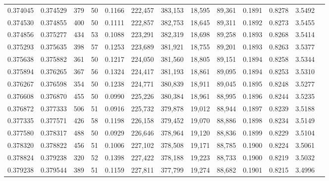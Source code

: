 \begin{tabular}{rrrrrrrrrrrrr}
0.374045 & 0.374529 &   379 &  50 &                                     0.1166 & 222,457 & 383,153 &  18,595 &  89,361 & 0.1891 & 0.8278 & 3.5492 \\
0.374530 & 0.374855 &   400 &  50 &                                     0.1111 & 222,857 & 382,753 &  18,645 &  89,311 & 0.1892 & 0.8273 & 3.5455 \\
0.374856 & 0.375277 &   434 &  53 &                                     0.1088 & 223,291 & 382,319 &  18,698 &  89,258 & 0.1893 & 0.8268 & 3.5414 \\
0.375293 & 0.375635 &   398 &  57 &                                     0.1253 & 223,689 & 381,921 &  18,755 &  89,201 & 0.1893 & 0.8263 & 3.5377 \\
0.375638 & 0.375882 &   361 &  50 &                                     0.1217 & 224,050 & 381,560 &  18,805 &  89,151 & 0.1894 & 0.8258 & 3.5344 \\
0.375894 & 0.376265 &   367 &  56 &                                     0.1324 & 224,417 & 381,193 &  18,861 &  89,095 & 0.1894 & 0.8253 & 3.5310 \\
0.376267 & 0.376598 &   354 &  50 &                                     0.1238 & 224,771 & 380,839 &  18,911 &  89,045 & 0.1895 & 0.8248 & 3.5277 \\
0.376608 & 0.376870 &   455 &  50 &                                     0.0990 & 225,226 & 380,384 &  18,961 &  88,995 & 0.1896 & 0.8244 & 3.5235 \\
0.376872 & 0.377333 &   506 &  51 &                                     0.0916 & 225,732 & 379,878 &  19,012 &  88,944 & 0.1897 & 0.8239 & 3.5188 \\
0.377335 & 0.377571 &   426 &  58 &                                     0.1198 & 226,158 & 379,452 &  19,070 &  88,886 & 0.1898 & 0.8234 & 3.5149 \\
0.377580 & 0.378317 &   488 &  50 &                                     0.0929 & 226,646 & 378,964 &  19,120 &  88,836 & 0.1899 & 0.8229 & 3.5104 \\
0.378320 & 0.378822 &   456 &  51 &                                     0.1006 & 227,102 & 378,508 &  19,171 &  88,785 & 0.1900 & 0.8224 & 3.5061 \\
0.378824 & 0.379238 &   320 &  52 &                                     0.1398 & 227,422 & 378,188 &  19,223 &  88,733 & 0.1900 & 0.8219 & 3.5032 \\
0.379238 & 0.379544 &   389 &  51 &                                     0.1159 & 227,811 & 377,799 &  19,274 &  88,682 & 0.1901 & 0.8215 & 3.4996 \\

\end{tabular}
